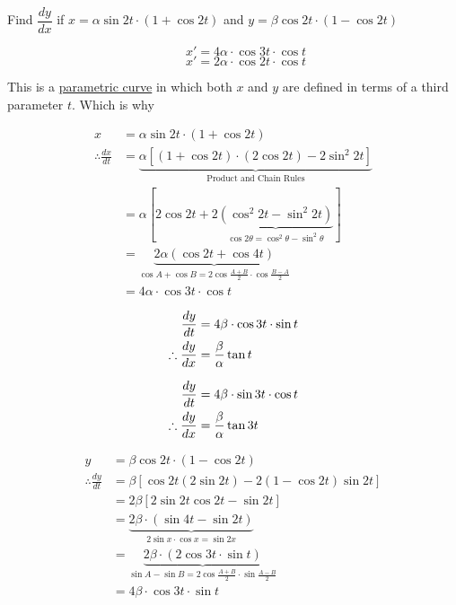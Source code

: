 \documentclass[14pt,fleqn]{extarticle}
\newcommand\fx{\alpha\sin 2t\cdot \left(1+\cos 2t \right)}
\newcommand\fy{\beta\cos 2t\cdot \left(1-\cos 2t \right)}
\begin{document}
\begin{question}
	\statement 
    
     Find $\dfrac{dy}{dx}$ if $x = \fx$ and $y=\fy$       
     
   \begin{step}
  \begin{options} 
     \correct 
       \[ \qquad x' = 4\alpha\cdot\cos 3t\cdot \cos t \]
     \incorrect
        \[ \qquad x' = 2\alpha\cdot\cos 2t\cdot \cos t \]
    \end{options} 
     \reason 
     
     This is a \underline{parametric curve} in which both $x$ and $y$ are defined 
     in terms of a third parameter $t$. Which is why
     
     \begin{align}
	 x &= \fx \\
	 \therefore \frac{dx}{dt} &= \underbrace{\alpha \left[\left(1+\cos 2t \right)\cdot \left(2\cos 2t \right) - 2\sin^2 2t  \right]}_{\text{Product and Chain Rules}} \\
	 &= \alpha \left[2\cos 2t + 2 \underbrace{\left(\cos^2 2t - \sin^2 2t \right)}_{\cos 2\theta = \cos^2\theta - \sin^2\theta} \right] \\
	 &= \underbrace{2\alpha \left(\cos 2t + \cos 4t \right)}_{\cos A + \cos B = 2\cos \frac{A+B}{2}\cdot \cos\frac{B-A}{2}} \\
	 &= 4\alpha\cdot\cos 3t\cdot \cos t
\end{align}
       
\end{step}

\begin{step}
  \begin{options} 
     \correct 
       \begin{align}
	\frac{dy}{dt} &= 4\beta \cdot\cos 3t \cdot \sin t \\
	\therefore \frac{dy}{dx} &= \frac{\beta}{\alpha}\tan t
\end{align}
     \incorrect
        
        \begin{align}
	\frac{dy}{dt} &= 4\beta \cdot\sin 3t \cdot \cos t \\
	\therefore \frac{dy}{dx} &= \frac{\beta}{\alpha}\tan 3t
\end{align}

    \end{options} 
     \reason 
       
       \begin{align}
	y &= \fy \\
	\therefore \frac{dy}{dt} &= \beta \left[\cos 2t \left(2\sin 2t \right) - 2 \left(1-\cos 2t \right)\sin 2t \right] \\
	&= 2\beta \left[2\sin 2t\cos 2t - \sin 2t  \right] \\
	&= \underbrace{2\beta \cdot \left(\sin 4t - \sin 2t \right)}_{2\sin x\cdot\cos x = \sin 2x } \\
	&= \underbrace{2\beta\cdot \left(2\cos 3t\cdot\sin t \right)}_{\sin A - \sin B = 2\cos \frac{A+B}{2}\cdot \sin \frac{A-B}{2}} \\
	&= 4\beta \cdot\cos 3t \cdot \sin t 
\end{align}


\end{step}
\end{question}
\end{document}
